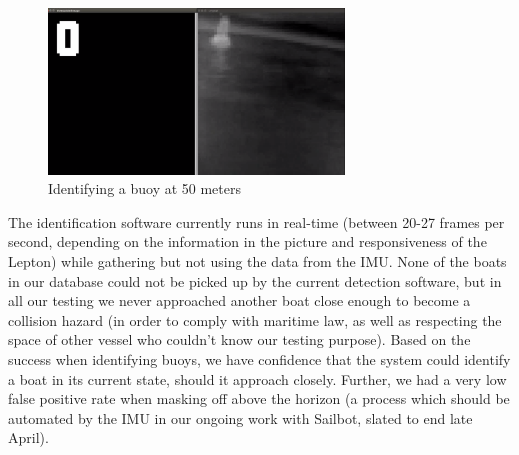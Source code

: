 \begin{figure}
\centering
\includegraphics[width=0.7\textwidth]{"./image/obstacle-detection"}
\caption{Identifying a buoy at 50 meters}
\label{fig:buoy_iden}
\end{figure}

The identification software currently runs in real-time (between 20-27 frames per second, depending on the information in the picture and responsiveness of the Lepton) while gathering but not using the data from the IMU. None of the boats in our database could not be picked up by the current detection software, but in all our testing we never approached another boat close enough to become a collision hazard (in order to comply with maritime law, as well as respecting the space of other vessel who couldn't know our testing purpose). Based on the success when identifying buoys, we have confidence that the system could identify a boat in its current state, should it approach closely. Further, we had a very low false positive rate when masking off above the horizon (a process which should be automated by the IMU in our ongoing work with Sailbot, slated to end late April).